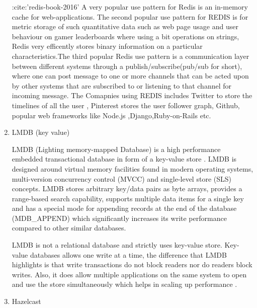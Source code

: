 \begin{enumerate}
:cite:'redis-book-2016' A very popular use pattern for Redis is
an in-memory cache for web-applications. The second popular use
pattern for REDIS is for metric storage of such quantitative data
such as web page usage and user behaviour on gamer leaderboards
where using a bit operations on strings, Redis very efficently
stores binary information on a particular characteristics.The
third popular Redis use pattern is a communication layer between
different systems through a publish/subscribe(pub/sub for short),
where one can post message to one or more channels that can be
acted upon by other systems that are subscribed to or listening
to that channel for incoming message. The Comapnies using REDIS
includes Twitter to store the timelines of all the user ,
Pinterest stores the user follower graph, Github, popular web
frameworks like Node.js ,Django,Ruby-on-Rails etc.

\item {} 
LMDB (key value)

LMDB (Lighting memory-mapped Database) is a high performance
embedded transactional database in form of a key-value store
\label{\detokenize{i524/technologies:id340}}{\hyperref[\detokenize{i524/technologies:www-keyvalue}]{\sphinxcrossref{{[}291{]}}}}. LMDB is designed around virtual memory
facilities found in modern operating systems, multi-version
concurrency control (MVCC) and single-level store (SLS)
concepts. LMDB stores arbitrary key/data pairs as byte arrays,
provides a range-based search capability, supports multiple data
items for a single key and has a special mode for appending
records at the end of the database (MDB\_APPEND) which
significantly increases its write performance compared to other
similar databases.

LMDB is not a relational database \label{\detokenize{i524/technologies:id341}}{\hyperref[\detokenize{i524/technologies:www-relationaldb}]{\sphinxcrossref{{[}292{]}}}} and
strictly uses key-value store. Key-value databases allows one
write at a time, the difference that LMDB highlights is that
write transactions do not block readers nor do readers block
writes. Also, it does allow multiple applications on the same
system to open and use the store simultaneously which helps in
scaling up performance \label{\detokenize{i524/technologies:id342}}{\hyperref[\detokenize{i524/technologies:www-lmdb}]{\sphinxcrossref{{[}293{]}}}}.

\item {} 
Hazelcast


\end{enumerate}

